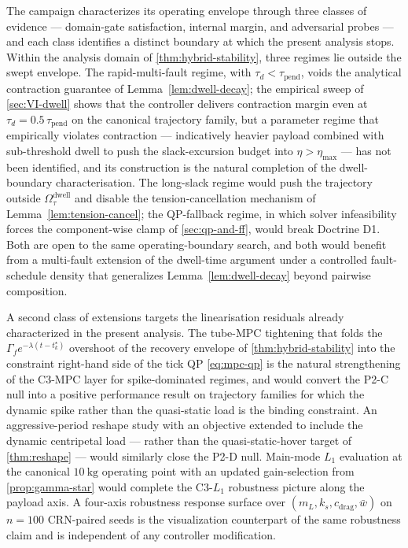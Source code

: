 The campaign characterizes its operating envelope through three classes of evidence --- domain-gate satisfaction, internal margin, and adversarial probes --- and each class identifies a distinct boundary at which the present analysis stops. Within the analysis domain of \cref{thm:hybrid-stability}, three regimes lie outside the swept envelope. The rapid-multi-fault regime, with $\tau_d<\tau_{\mathrm{pend}}$, voids the analytical contraction guarantee of Lemma~\ref{lem:dwell-decay}; the empirical sweep of \cref{sec:VI-dwell} shows that the controller delivers contraction margin even at $\tau_d=0.5\,\tau_{\mathrm{pend}}$ on the canonical trajectory family, but a parameter regime that empirically violates contraction --- indicatively heavier payload combined with sub-threshold dwell to push the slack-excursion budget into $\eta>\eta_{\max}$ --- has not been identified, and its construction is the natural completion of the dwell-boundary characterisation. The long-slack regime would push the trajectory outside $\Omega^{\mathrm{dwell}}_{\tau}$ and disable the tension-cancellation mechanism of Lemma~\ref{lem:tension-cancel}; the QP-fallback regime, in which solver infeasibility forces the component-wise clamp of \cref{sec:qp-and-ff}, would break Doctrine D1. Both are open to the same operating-boundary search, and both would benefit from a multi-fault extension of the dwell-time argument under a controlled fault-schedule density that generalizes Lemma~\ref{lem:dwell-decay} beyond pairwise composition.

A second class of extensions targets the linearisation residuals already characterized in the present analysis. The tube-MPC tightening that folds the $\Gamma_f e^{-\lambda(t-t_k^{\star})}$ overshoot of the recovery envelope of \cref{thm:hybrid-stability} into the constraint right-hand side of the tick QP \eqref{eq:mpc-qp} is the natural strengthening of the C3-MPC layer for spike-dominated regimes, and would convert the P2-C null into a positive performance result on trajectory families for which the dynamic spike rather than the quasi-static load is the binding constraint. An aggressive-period reshape study with an objective extended to include the dynamic centripetal load --- rather than the quasi-static-hover target of \cref{thm:reshape} --- would similarly close the P2-D null. Main-mode $L_1$ evaluation at the canonical $\SI{10}{\kilo\gram}$ operating point with an updated gain-selection from \cref{prop:gamma-star} would complete the C3-$L_1$ robustness picture along the payload axis. A four-axis robustness response surface over $(m_L,k_s,c_{\mathrm{drag}},\bar{w})$ on $n=100$ CRN-paired seeds is the visualization counterpart of the same robustness claim and is independent of any controller modification.

